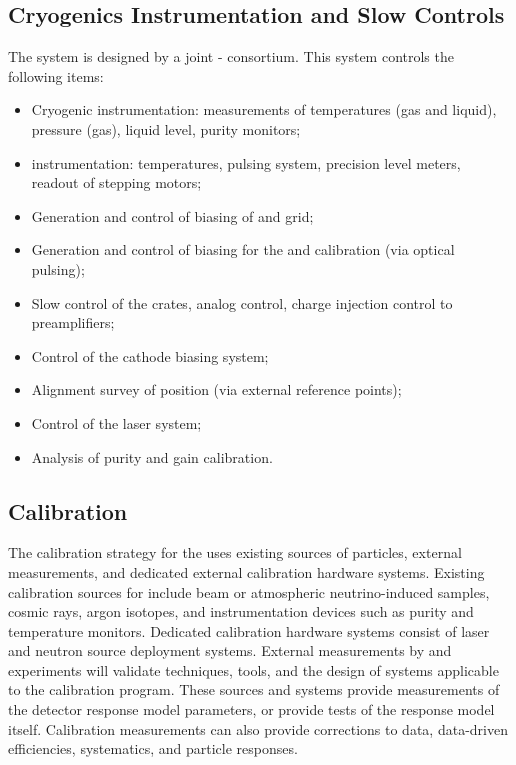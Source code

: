 \subsection{Cryogenics Instrumentation and Slow Controls}
\label{sec:dp-execsum-sc}
The  system is designed by a joint - consortium. 
This system controls the following items:

\begin{itemize}
\item Cryogenic instrumentation: measurements of temperatures (gas and liquid), pressure (gas), liquid level, purity monitors;
\item {} instrumentation: temperatures, pulsing system, precision level meters, readout of  stepping motors;
\item Generation and control of  biasing of  and grid;
\item Generation and control of  biasing for the  and calibration (via optical pulsing);
\item Slow control of the  crates, analog  control, charge injection control to preamplifiers;
\item Control of the cathode  biasing system;
\item Alignment survey of  position (via external reference points);
\item Control of the laser system;
\item Analysis of  purity and   gain calibration.
\end{itemize}

\subsection{Calibration}
\label{sec:dp-execsum-calib}
  The calibration strategy for the   uses existing sources of particles, external measurements, and dedicated external calibration hardware systems. Existing calibration sources for  include beam or atmospheric neutrino-induced samples, cosmic rays, argon isotopes, and instrumentation devices such as  purity and temperature monitors. Dedicated calibration hardware systems consist of laser  and neutron source deployment systems.  External measurements by  and  experiments  will validate techniques, tools, and the design of systems applicable to the  calibration program. These sources and systems provide measurements of the detector response model parameters, or provide tests of the response model itself. Calibration measurements can also provide corrections to data, data-driven efficiencies, systematics, and particle responses.